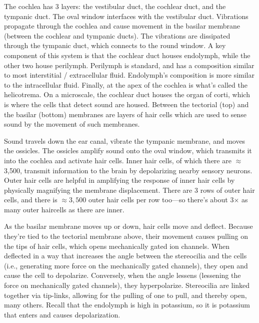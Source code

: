 The cochlea has 3 layers: the vestibular duct, the cochlear duct, and the tympanic duct. The oval window interfaces with the vestibular duct. Vibrations propagate through the cochlea and cause movement in the basilar membrane (between the cochlear and tympanic ducts). The vibrations are dissipated through the tympanic duct, which connects to the round window. A key component of this system is that the cochlear duct houses endolymph, while the other two house perilymph. Perilymph is standard, and has a composition similar to most interstitial / extracellular fluid. Endolymph's composition is more similar to the intracellular fluid. Finally, at the apex of the cochlea is what's called the helicotrema. On a microscale, the cochlear duct houses the organ of corti, which is where the cells that detect sound are housed. Between the tectorial (top) and the basilar (bottom) membranes are layers of hair cells which are used to sense sound by the movement of such membranes.\newline

Sound travels down the ear canal, vibrate the tympanic membrane, and moves the ossicles. The ossicles amplify sound onto the oval window, which transmits it into the cochlea and activate hair cells. Inner hair cells, of which there are $\approx$ 3,500, transmit information to the brain by depolarizing nearby sensory neurons. Outer hair cells are helpful in amplifying the response of inner hair cells by physically magnifying the membrane displacement. There are 3 rows of outer hair cells, and there is $\approx 3,500$ outer hair cells per row too---so there's about 3$\times$ as many outer haircells as there are inner.\newline

As the basilar membrane moves up or down, hair cells move and deflect. Because they're tied to the tectorial membrane above, their movement causes pulling on the tips of hair cells, which opens mechanically gated ion channels. When deflected in a way that increases the angle between the stereocilia and the cells (i.e., generating more force on the mechanically gated channels), they open and cause the cell to depolarize. Conversely, when the angle lessens (lessening the force on mechanically gated channels), they hyperpolarize. Stereocilia are linked together via tip-links, allowing for the pulling of one to pull, and thereby open, many others. Recall that the endolymph is high in potassium, so it is potassium that enters and causes depolarization.\newline

